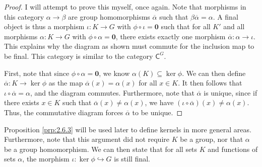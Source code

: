\begin{proof}
	I will attempt to prove this myself, once again. Note that morphisms in this category $\alpha \to \beta  $ are group homomorphisms $\overline{\alpha } $ such that $\beta \overline{\alpha} =\alpha $. A final object is thus a morphism $\iota : K\to G$ with $\phi  \circ \iota =\mathbf{0}$ such that for all $K'$ and all morphisms $\alpha : K \to G$ with $\phi \circ \alpha =\mathbf{0}$, there exists exactly one morphism $\overline{\alpha} : \alpha  \to \iota $. This explains why the diagram as shown must commute for the inclusion map to be final. This category is similar to the category $\mathsf{C}^G$.

	First, note that since $\phi\circ  \alpha =\mathbf{0}$, we know $\alpha (K)\subseteq \ker \phi $. We can then define $\overline{\alpha } : K \to \ker \phi $ as the map $\overline{\alpha} (x)=\alpha (x)$ for all $x\in K$. It then follows that $\iota \circ \overline{\alpha}=\alpha$, and the diagram commutes. Furthermore, note that $\overline{\alpha } $ is unique, since if there exists $x\in K$ such that $\overline{\alpha}(x)\neq \alpha (x)$, we have $(\iota \circ \overline{\alpha}  )(x)\neq \alpha (x)$. Thus, the commutative diagram forces $\overline{\alpha } $ to be unique.
\end{proof}

Proposition \ref{prp:2.6.3} will be used later to define kernels in more general areas. Furthermore, note that this argument did not require $K$ be a group, nor that $ \alpha $ be a group homomorphism. We can then state that for all sets $K$ and functions of sets $\alpha $, the morphism $\iota : \ker \phi  \hookrightarrow G$ is still final.

